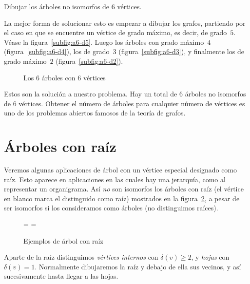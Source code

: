   \begin{example}
    Dibujar los árboles no isomorfos de \(6\) vértices.

    La mejor forma de solucionar esto
    es empezar a dibujar los grafos,
    partiendo por el caso
    en que se encuentre un vértice de grado máximo,
    es decir,
    de grado~\(5\).
    Véase la figura~\ref{subfig:a6-d5}.
    Luego los árboles con grado máximo~\(4\)
    (figura~\ref{subfig:a6-d4}),
    los de grado~\(3\)
    (figura~\ref{subfig:a6-d3}),
    y finalmente los de grado máximo~\(2\)
    (figura~\ref{subfig:a6-d2}).
    \begin{figure}[htbp]
      \centering
      \hspace*{4em}%


      \caption{Los \(6\) árboles con \(6\) vértices}
      \label{fig:arbol6}
    \end{figure}
    Estos son la solución a nuestro problema.
    Hay un total de \(6\) árboles no isomorfos de \(6\) vértices.
    Obtener el número de árboles para cualquier número de vértices
    es uno de los problemas abiertos famosos de la teoría de grafos.
  \end{example}

\section{Árboles con raíz}
\label{sec:arboles-raiz}

  Veremos algunas aplicaciones de árbol
  con un vértice especial designado como raíz.
  Esto aparece en aplicaciones en las cuales hay una jerarquía,
  como al representar un organigrama.
  Así \emph{no} son isomorfos los árboles con raíz
  (el vértice en blanco marca el distinguido como raíz)
  mostrados en la figura~\ref{fig:arbol-raiz},
  a pesar de ser isomorfos si los consideramos como árboles
  (no distinguimos raíces).
  \begin{figure}[htbp]
    =\hbox{}
    =\hbox{}
    \centering
    \subfloat{
      \raisebox{0.5\ht2-0.5\ht1}{\copy1}
    }%
    \hspace{3.5em}%
    \caption{Ejemplos de árbol con raíz}
    \label{fig:arbol-raiz}
  \end{figure}
  Aparte de la raíz distinguimos \emph{vértices internos}
  con \(\delta(v) \ge 2\),
  y \emph{hojas} con \(\delta(v) = 1\).
  Normalmente dibujaremos la raíz y debajo de ella sus vecinos,
  y así sucesivamente hasta llegar a las hojas.

